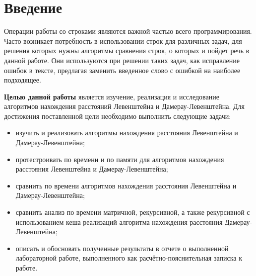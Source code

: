 \chapter*{Введение}

Операции работы со строками являются важной частью всего программирования. Часто возникает потребность в использовании строк для различных задач, для решения которых нужны алгоритмы сравнения строк, о которых и пойдет речь в данной работе.
Они используются при решении таких задач, как исправление ошибок в тексте, предлагая заменить введенное слово с ошибкой на наиболее подходящее.



\textbf{Целью данной работы} является изучение, реализация и исследование алгоритмов нахождения расстояний Левенштейна и Дамерау-Левенштейна.
Для достижения поставленной цели необходимо выполнить следующие задачи:
\begin{itemize}
	\item изучить и реализовать алгоритмы нахождения расстояния Левенштейна и Дамерау-Левенштейна;
    \item протестроивать по времени и по памяти для алгоритмов нахождения расстояния Левенштейна и Дамерау-Левенштейна;
    \item сравнить по времени алгоритмов нахождения расстояния Левенштейна и Дамерау-Левенштейна;
    \item сравнить анализ по времени матричной, рекурсивной, а также рекурсивной с использованием кеша реализаций алгоритма нахождения расстояния Дамерау-Левенштейна;
	\item описать и обосновать полученные результаты в отчете о выполненной лабораторной работе, выполненного как расчётно-пояснительная записка к работе.
\end{itemize}
